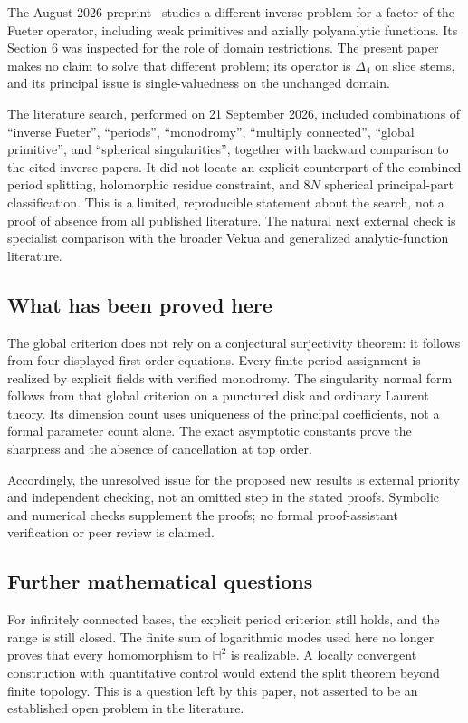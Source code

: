 \documentclass[11pt,a4paper]{article}
\numberwithin{equation}{section}
\theoremstyle{definition}
\theoremstyle{remark}
\newcommand{\HH}{\mathbb H}
\newcommand{\Lap}{\Delta_4}
\begin{document}
The August 2026 preprint~\cite{DP2026} studies a different inverse problem
for a factor of the Fueter operator, including weak primitives and
axially polyanalytic functions. Its Section 6 was inspected for the
role of domain restrictions. The present paper makes no claim to solve
that different problem; its operator is $\Lap$ on slice stems, and its
principal issue is single-valuedness on the unchanged domain.

The literature search, performed on 21 September 2026, included combinations
of ``inverse Fueter'', ``periods'', ``monodromy'', ``multiply connected'',
``global primitive'', and ``spherical singularities'', together with
backward comparison to the cited inverse papers. It did not locate an
explicit counterpart of the combined period splitting, holomorphic
residue constraint, and $8N$ spherical principal-part classification.
This is a limited, reproducible statement about the search, not a proof
of absence from all published literature. The natural next external
check is specialist comparison with the broader Vekua and generalized
analytic-function literature.

\subsection{What has been proved here}
The global criterion does not rely on a conjectural surjectivity theorem:
it follows from four displayed first-order equations. Every finite
period assignment is realized by explicit fields with verified
monodromy. The singularity normal form follows from that global
criterion on a punctured disk and ordinary Laurent theory. Its
dimension count uses uniqueness of the principal coefficients, not a
formal parameter count alone. The exact asymptotic constants prove the
sharpness and the absence of cancellation at top order.

Accordingly, the unresolved issue for the proposed new results is
external priority and independent checking, not an omitted step in the
stated proofs. Symbolic and numerical checks supplement the proofs;
no formal proof-assistant verification or peer review is claimed.

\subsection{Further mathematical questions}
For infinitely connected bases, the explicit period criterion still
holds, and the range is still closed. The finite sum of logarithmic
modes used here no longer proves that every homomorphism to $\HH^2$ is
realizable. A locally convergent construction with quantitative control
would extend the split theorem beyond finite topology. This is a
question left by this paper, not asserted to be an established open
problem in the literature.
\end{document}
